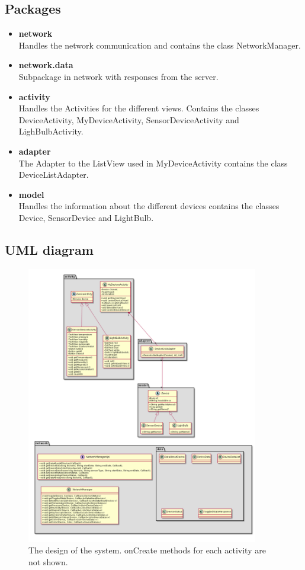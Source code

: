 \documentclass[a4paper]{article}
\begin{document}
	\subsection{Packages}
	\begin{itemize}
		\item {\textbf{network}} \\
        Handles the network communication and contains the class NetworkManager.
        \item {\textbf{network.data}} \\
        Subpackage in network with responses from the server.
		\item {\textbf{activity}}\\
        Handles the Activities for the different views. Contains the classes DeviceActivity, MyDeviceActivity, SensorDeviceActivity and LighBulbActivity.
		\item {\textbf{adapter}}\\
        The Adapter to the ListView used in MyDeviceActivity contains the class DeviceListAdapter.
		\item {\textbf{model}}\\
        Handles the information about the different devices contains the classes Device, SensorDevice and LightBulb.
	\end{itemize}
\subsection{UML diagram}
	\begin{figure}[H]
    \centering
    \includegraphics[width=0.9\textwidth]{class_diagram.png}
    \caption{The design of the system. onCreate methods for each activity are not shown.}
    \label{fig:uml}
\end{figure}
\end{document}
